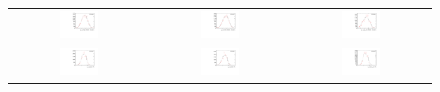 \begin{figure}
\begin{tabular}{ccc}
\includegraphics[width=0.3\textwidth]{ANA_resources/Plots/Monte_carlo/data_vs_MC/weight/Kpi/log10(D0K_IPCHI2_OWNPV)_2016.pdf} & \includegraphics[width=0.3\textwidth]{ANA_resources/Plots/Monte_carlo/data_vs_MC/weight/Kpi/log10(D0Pi_IPCHI2_OWNPV)_2016.pdf} & \includegraphics[width=0.3\textwidth]{ANA_resources/Plots/Monte_carlo/data_vs_MC/weight/Kpi/log10(KstarPi_IPCHI2_OWNPV)_2016.pdf} \\
\includegraphics[width=0.3\textwidth]{ANA_resources/Plots/Monte_carlo/data_vs_MC/weight/Kpi/log10(D0K_PT)_2016.pdf} & \includegraphics[width=0.3\textwidth]{ANA_resources/Plots/Monte_carlo/data_vs_MC/weight/Kpi/log10(D0Pi_PT)_2016.pdf} & \includegraphics[width=0.3\textwidth]{ANA_resources/Plots/Monte_carlo/data_vs_MC/weight/Kpi/log10(KstarK_PT)_2016.pdf} \\

\end{tabular}
\end{figure}
